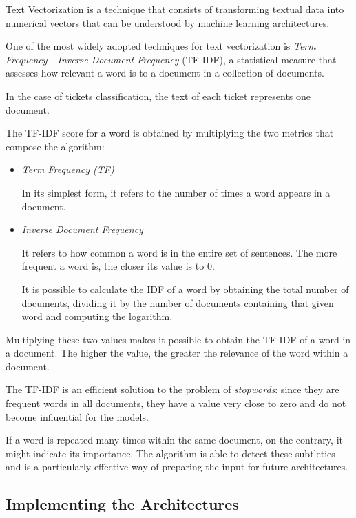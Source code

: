 \documentclass[letterpaper,11pt]{article}
\begin{document}
Text Vectorization is a technique that consists of transforming textual data into numerical vectors that can be understood by machine learning architectures.

One of the most widely adopted techniques for text vectorization is \textit{Term Frequency - Inverse Document Frequency} (TF-IDF), a statistical measure that assesses how relevant a word is to a document in a collection of documents.

In the case of tickets classification, the text of each ticket represents one document.

The TF-IDF score for a word is obtained by multiplying the two metrics that compose the algorithm:

\begin{itemize}
  \item \textit{Term Frequency (TF)}
  
  In its simplest form, it refers to the number of times a word appears in a document.

  \item \textit{Inverse Document Frequency}
  
  It refers to how common a word is in the entire set of sentences. The more frequent a word is, the closer its value is to 0.

  It is possible to calculate the IDF of a word by obtaining the total number of documents, dividing it by the number of documents containing that given word and computing the logarithm.
\end{itemize}

Multiplying these two values makes it possible to obtain the TF-IDF of a word in a document. The higher the value, the greater the relevance of the word within a document.

The TF-IDF is an efficient solution to the problem of \textit{stopwords}: since they are frequent words in all documents, they have a value very close to zero and do not become influential for the models.

If a word is repeated many times within the same document, on the contrary, it might indicate its importance. The algorithm is able to detect these subtleties and is a particularly effective way of preparing the input for future architectures.


\subsection{Implementing the Architectures}
\end{document}
